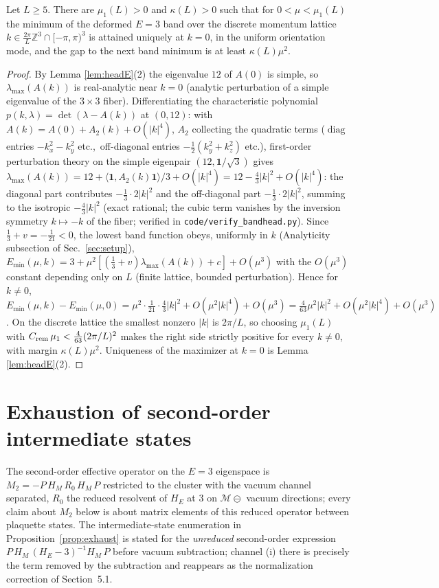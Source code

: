 \begin{proposition}\label{prop:headexact}
Let $L\ge5$. There are $\mu_1(L)>0$ and $\kappa(L)>0$ such that for
$0<\mu<\mu_1(L)$ the minimum of the deformed $E=3$ band over the discrete
momentum lattice $k\in\frac{2\pi}{L}\mathbb Z^3\cap[-\pi,\pi)^3$ is attained
uniquely at $k=0$, in the uniform orientation mode, and the gap to the next
band minimum is at least $\kappa(L)\mu^2$.
\end{proposition}
\begin{proof}
By Lemma \ref{lem:headE}(2) the eigenvalue $12$ of $A(0)$ is simple, so
$\lambda_{\max}(A(k))$ is real-analytic near $k=0$ (analytic perturbation of
a simple eigenvalue of the $3\times3$ fiber). Differentiating the
characteristic polynomial $p(k,\lambda)=\det(\lambda-A(k))$ at $(0,12)$:
with $A(k)=A(0)+A_2(k)+O(|k|^4)$, $A_2$ collecting the quadratic terms
($\operatorname{diag}$ entries $-k_x^2-k_y^2$ etc.,\ off-diagonal entries
$-\tfrac12(k_y^2+k_z^2)$ etc.), first-order perturbation theory on the simple
 eigenpair $(12,\mathbf1/\sqrt3)$ gives
$\lambda_{\max}(A(k))=12+\langle\mathbf1,A_2(k)\mathbf1\rangle/3+O(|k|^4)
=12-\tfrac{4}{3}|k|^2+O(|k|^4)$: the diagonal part contributes
$-\tfrac13\cdot2|k|^2$ and the off-diagonal part $-\tfrac13\cdot2|k|^2$,
summing to the isotropic $-\tfrac43|k|^2$ (exact rational; the cubic term
vanishes by the inversion symmetry $k\mapsto-k$ of the fiber; verified in
\texttt{code/verify\_bandhead.py}).
Since $\tfrac13+v=-\tfrac1{21}<0$, the lowest band function obeys,
uniformly in $k$ (Analyticity subsection of Sec.~\ref{sec:setup}),
$E_{\min}(\mu,k)=3+\mu^2[(\tfrac13+v)\lambda_{\max}(A(k))+c]+O(\mu^3)$ with
the $O(\mu^3)$ constant depending only on $L$ (finite lattice, bounded
perturbation). Hence for $k\ne0$,
$E_{\min}(\mu,k)-E_{\min}(\mu,0)
=\mu^2\cdot\tfrac{1}{21}\cdot\tfrac{4}{3}|k|^2+O(\mu^2|k|^4)+O(\mu^3)
=\tfrac{4}{63}\mu^2|k|^2+O(\mu^2|k|^4)+O(\mu^3)$.
On the discrete lattice the smallest nonzero $|k|$ is $2\pi/L$, so choosing
$\mu_1(L)$ with $C_{\rm rem}\,\mu_1<\tfrac{4}{63}(2\pi/L)^2$ makes the right
side strictly positive for every $k\ne0$, with margin $\kappa(L)\mu^2$.
Uniqueness of the maximizer at $k=0$ is Lemma \ref{lem:headE}(2).
\end{proof}

\section{Exhaustion of second-order intermediate states}\label{app:F}
The second-order effective operator on the $E=3$ eigenspace is
$M_2=-P\,H_M\,R_0\,H_M\,P$ restricted to the cluster with the vacuum
channel separated, $R_0$ the reduced resolvent of $H_E$ at $3$ on
$\mathcal M\ominus$ vacuum directions; every claim about
$M_2$ below is about matrix elements of this reduced operator between
plaquette states. The intermediate-state enumeration in
Proposition~\ref{prop:exhaust} is stated for the \emph{unreduced}
second-order expression $P\,H_M\,(H_E-3)^{-1}H_M\,P$ before vacuum
subtraction; channel (i) there is precisely the term removed by the
subtraction and reappears as the normalization correction of
Section~5.1.

